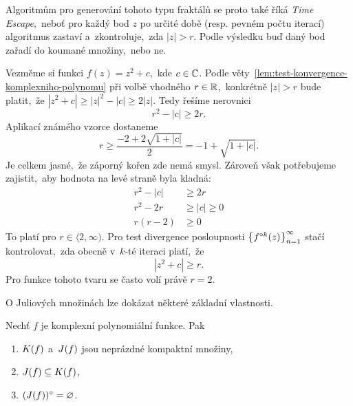 Algoritmům pro generování tohoto typu fraktálů se proto také říká \emph{Time Escape},~neboť pro každý bod $z$ po určité době (resp. pevném počtu iterací) algoritmus zastaví a~zkontroluje,~zda $|z|>r$. Podle výsledku buď daný bod zařadí do koumané množiny,~nebo ne.
\begin{example}
    Vezměme si funkci $f(z)=z^2+c$,~kde $c\in\mathbb{C}$. Podle věty~\ref{lem:test-konvergence-komplexniho-polynomu} při volbě vhodného $r\in\mathbb{R}$,~konkrétně $|z|>r$ bude platit,~že $|z^2+c|\geqslant|z|^2-|c|\geqslant 2|z|$. Tedy řešíme nerovnici
    \[r^2-|c|\geqslant 2r.\]
    Aplikací známého vzorce dostaneme
    \[r\geqslant\frac{-2+2\sqrt{1+|c|}}{2}=-1+\sqrt{1+|c|}.\]
    Je celkem jasné,~že záporný kořen zde nemá smysl. Zároveň však potřebujeme zajistit,~aby hodnota na levé straně byla kladná:
    \begin{align*}
        r^2-|c|&\geqslant 2r\\
        r^2-2r&\geqslant|c|\geqslant 0\\
        r(r-2)&\geqslant 0
    \end{align*}
    To platí pro $r\in\langle 2,\infty)$. Pro test divergence posloupnosti $\left\{f^{\circ k}(z)\right\}_{n=1}^\infty$ stačí kontrolovat,~zda obecně v~$k$-té iteraci platí,~že
    \[|z^2+c|\geqslant r.\]
    Pro funkce tohoto tvaru se často volí právě $r=2$.
\end{example}
O Juliových množinách lze dokázat některé základní vlastnosti.
\begin{theorem}\label{thm:vztah-kf-a-jf}
    Nechť $f$ je komplexní polynomiální funkce. Pak
    \begin{enumerate}[label=(\roman*)]
        \item\label{thm:kompaktnost-kf-jf} $K(f)$ a~$J(f)$ jsou neprázdné kompaktní množiny,
        \item\label{thm:jf-podmnozina-kf} $J(f)\subseteq K(f)$,
        \item\label{thm:vnitrek-jf-neprazdny} $(J(f))^\circ=\varnothing$.
    \end{enumerate}
\end{theorem}
